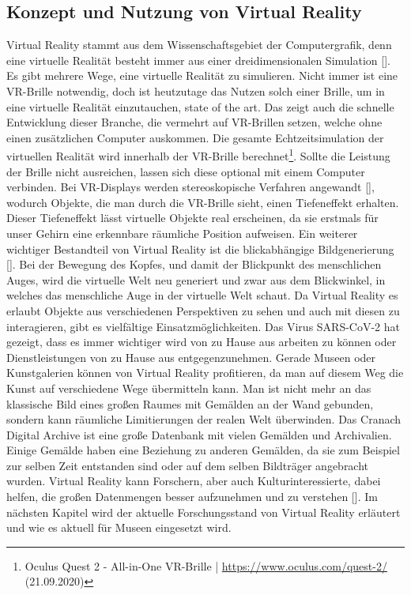 \documentclass[a4paper,12pt,oneside]{article}
\begin{document}
    \subsection{Konzept und Nutzung von Virtual Reality} \label{Konzept und Nutzung von VR}
      Virtual Reality stammt aus dem Wissenschaftsgebiet der Computergrafik, denn eine
      virtuelle Realität besteht immer aus einer dreidimensionalen Simulation [\cite[13]{Dorner2019}].
      Es gibt mehrere Wege, eine virtuelle Realität zu simulieren. Nicht immer ist eine 
      VR-Brille notwendig, doch ist heutzutage das Nutzen solch einer Brille, um in eine 
      virtuelle Realität einzutauchen, state of the art. Das zeigt auch die schnelle 
      Entwicklung dieser Branche, die vermehrt auf VR-Brillen setzen, welche ohne einen
      zusätzlichen Computer auskommen. Die gesamte Echtzeitsimulation der virtuellen
      Realität wird innerhalb der VR-Brille berechnet\footnote{Oculus Quest 2 - All-in-One VR-Brille | \url{https://www.oculus.com/quest-2/} (21.09.2020)}.
      Sollte die Leistung der Brille nicht ausreichen, lassen sich diese optional mit einem
      Computer verbinden. Bei VR-Displays werden stereoskopische Verfahren angewandt [\cite[13]{Dorner2019}],
      wodurch Objekte, die man durch die VR-Brille sieht, einen Tiefeneffekt erhalten.
      Dieser Tiefeneffekt lässt virtuelle Objekte real erscheinen, da sie erstmals für unser
      Gehirn eine erkennbare räumliche Position aufweisen. Ein weiterer wichtiger
      Bestandteil von Virtual Reality ist die blickabhängige Bildgenerierung [\cite[13]{Dorner2019}].
      Bei der Bewegung des Kopfes, und damit der Blickpunkt des menschlichen Auges, wird
      die virtuelle Welt neu generiert und zwar aus dem Blickwinkel, in welches das
      menschliche Auge in der virtuelle Welt schaut. Da Virtual Reality es erlaubt Objekte
      aus verschiedenen Perspektiven zu sehen und auch mit diesen zu interagieren, gibt
      es vielfältige Einsatzmöglichkeiten. Das Virus SARS-CoV-2 hat gezeigt, dass es
      immer wichtiger wird von zu Hause aus arbeiten zu können oder Dienstleistungen von
      zu Hause aus entgegenzunehmen. Gerade Museen oder Kunstgalerien können von
      Virtual Reality profitieren, da man auf diesem Weg die Kunst auf verschiedene
      Wege übermitteln kann. Man ist nicht mehr an das klassische Bild eines großen
      Raumes mit Gemälden an der Wand gebunden, sondern kann räumliche Limitierungen der
      realen Welt überwinden. Das Cranach Digital Archive ist eine große Datenbank mit
      vielen Gemälden und Archivalien. Einige Gemälde haben eine Beziehung zu anderen 
      Gemälden, da sie zum Beispiel zur selben Zeit entstanden sind oder auf dem selben
      Bildträger angebracht wurden. Virtual Reality kann Forschern, aber auch 
      Kulturinteressierte, dabei helfen, die großen Datenmengen besser aufzunehmen und
      zu verstehen [\cite[9]{Dorner2019}]. Im nächsten Kapitel wird der aktuelle
      Forschungsstand von Virtual Reality erläutert und wie es aktuell für Museen
      eingesetzt wird.
\end{document}
